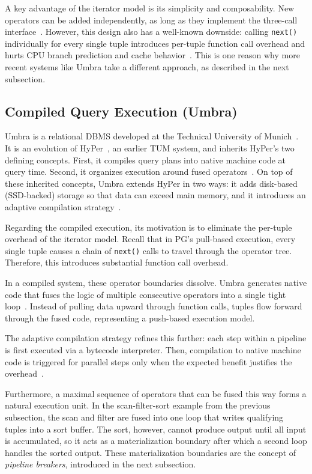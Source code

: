 A key advantage of the iterator model is its simplicity and composability.
New operators can be added independently, as long as they implement the three-call interface~\parencite{graefe1994}.
However, this design also has a well-known downside: calling \texttt{next()} individually for every single tuple introduces per-tuple function call overhead and hurts CPU branch prediction and cache behavior~\parencite{neumann2011}.
This is one reason why more recent systems like Umbra take a different approach, as described in the next subsection.

\subsection{Compiled Query Execution (Umbra)}

Umbra is a relational DBMS developed at the Technical University of Munich~\parencite{umbra2020}.
It is an evolution of HyPer~\parencite{neumann2011, umbra2020}, an earlier TUM system, and inherits HyPer's two defining concepts.
First, it compiles query plans into native machine code at query time.
Second, it organizes execution around fused operators~\parencite{neumann2011}.
On top of these inherited concepts, Umbra extends HyPer in two ways: it adds disk-based (SSD-backed) storage so that data can exceed main memory, and it introduces an adaptive compilation strategy~\parencite{umbra2020}.

Regarding the compiled execution, its motivation is to eliminate the per-tuple overhead of the iterator model.
Recall that in PG's pull-based execution, every single tuple causes a chain of \texttt{next()} calls to travel through the operator tree.
Therefore, this introduces substantial function call overhead.

In a compiled system, these operator boundaries dissolve.
Umbra generates native code that fuses the logic of multiple consecutive operators into a single tight loop~\parencite{neumann2011}.
Instead of pulling data upward through function calls, tuples flow forward through the fused code, representing a push-based execution model.

The adaptive compilation strategy refines this further: each step within a pipeline is first executed via a bytecode interpreter.
Then, compilation to native machine code is triggered for parallel steps only when the expected benefit justifies the overhead~\parencite{umbra2020}.

Furthermore, a maximal sequence of operators that can be fused this way forms a natural execution unit.
In the scan-filter-sort example from the previous subsection, the scan and filter are fused into one loop that writes qualifying tuples into a sort buffer.
The sort, however, cannot produce output until all input is accumulated, so it acts as a materialization boundary after which a second loop handles the sorted output.
These materialization boundaries are the concept of \emph{pipeline breakers}, introduced in the next subsection.

